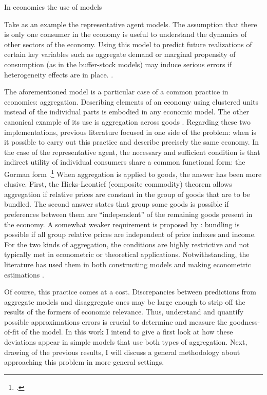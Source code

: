 \documentclass[english, a4paper,12pt]{article}
\begin{document}
In economics the use of models

Take as an example the representative agent models. The assumption that there is only one consumer in the economy is useful to understand the dynamics of other sectors of the economy. Using this model to predict future realizations of certain key variables such as aggregate demand or marginal propensity of consumption (as in the buffer-stock models) may induce serious errors if heterogeneity effects are in place. .

The aforementioned model is a particular case of a common practice in economics: aggregation. Describing elements of an economy using clustered units instead of the individual parts is embodied in any economic model. The other canonical example of its use is aggregation across goods . Regarding these two implementations, previous literature focused in one side of the problem: when is it possible to carry out this practice and describe precisely the same economy. In the case of the representative agent, the necessary and sufficient condition is that indirect utility of individual consumers share a common functional form: the Gorman form .\footnote{\cite{Gorman53}.} When aggregation is applied to goods, the answer has been more elusive. First, the Hicks-Leontief (composite commodity) theorem allows aggregation if relative prices are constant in the group of goods that are to be bundled. The second answer states that group some goods is possible if preferences between them are ``independent'' of the remaining goods present in the economy. A somewhat weaker requirement is proposed by \cite{Lewbel96}: bundling is possible if all group relative prices are independent of price indexes and income. For the two kinds of aggregation, the conditions are highly restrictive and not typically met in econometric or theoretical applications. Notwithstanding, the literature has used them in both constructing models and making econometric estimations .

Of course, this practice comes at a cost. Discrepancies between predictions from aggregate models and disaggregate ones may be large enough to strip off the results of the formers of economic relevance. Thus, understand and quantify possible approximations errors is crucial to determine and measure the goodness-of-fit of the model. In this work I intend to give a first look at how these deviations appear in simple models that use both types of aggregation. Next, drawing of the previous results, I will discuss a general methodology about approaching this problem in more general settings. 
\end{document}

